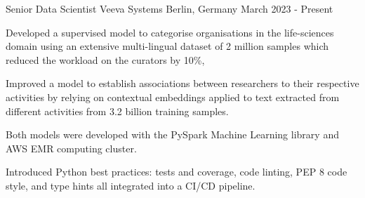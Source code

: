 

\begin{cventries}
  \cventry
    {Senior Data Scientist} %
    {Veeva Systems} %
    {Berlin, Germany} %
    {March 2023 - Present } %
	{
      \begin{cvitems} %
		\item {Developed a supervised model to categorise organisations in the life-sciences domain using an extensive multi-lingual dataset of 2 million samples which reduced the workload on the curators by 10\%, }
		\item {Improved a model to establish associations between researchers to their respective activities by relying on contextual embeddings applied to text extracted from different activities from 3.2 billion training samples.}
		\item {Both models were developed with the PySpark Machine Learning library and AWS EMR computing cluster.}
		\item {Introduced Python best practices: tests and coverage, code linting, PEP 8 code style, and type hints all integrated into a CI/CD pipeline.}
      \end{cvitems}
    }


\end{cventries}
